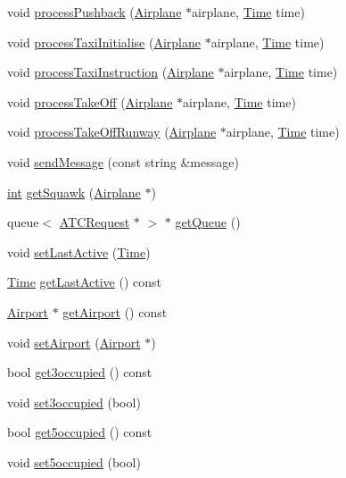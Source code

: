 \begin{DoxyCompactItemize}
\item 
void \hyperlink{classATC_a15754e64db38a7d1280d1ffd5b1db652}{process\+Pushback} (\hyperlink{classAirplane}{Airplane} $\ast$airplane, \hyperlink{classTime}{Time} time)
\item 
void \hyperlink{classATC_a50cbfabf87d9ebc20ca89baea036d602}{process\+Taxi\+Initialise} (\hyperlink{classAirplane}{Airplane} $\ast$airplane, \hyperlink{classTime}{Time} time)
\item 
void \hyperlink{classATC_aa56d55e184aa49375693bccfc016a689}{process\+Taxi\+Instruction} (\hyperlink{classAirplane}{Airplane} $\ast$airplane, \hyperlink{classTime}{Time} time)
\item 
void \hyperlink{classATC_ac5a18f099244ebdc6edcca687d02c1cf}{process\+Take\+Off} (\hyperlink{classAirplane}{Airplane} $\ast$airplane, \hyperlink{classTime}{Time} time)
\item 
void \hyperlink{classATC_a90ec9958b0a3b1d4395959afa14165c0}{process\+Take\+Off\+Runway} (\hyperlink{classAirplane}{Airplane} $\ast$airplane, \hyperlink{classTime}{Time} time)
\item 
void \hyperlink{classATC_aa78b32354d28f3f2eac0143df617283b}{send\+Message} (const string \&message)
\item 
\hyperlink{CMakeCache_8txt_a79a3d8790b2588b09777910863574e09}{int} \hyperlink{classATC_a6c145d824a9d8a796cbc4bab4519c60a}{get\+Squawk} (\hyperlink{classAirplane}{Airplane} $\ast$)
\item 
queue$<$ \hyperlink{structATCRequest}{A\+T\+C\+Request} $\ast$ $>$ $\ast$ \hyperlink{classATC_abdb60fa0db49dd24abe6392f974d1d51}{get\+Queue} ()
\item 
void \hyperlink{classATC_a797e1a713735665a8a87047d7d93f940}{set\+Last\+Active} (\hyperlink{classTime}{Time})
\item 
\hyperlink{classTime}{Time} \hyperlink{classATC_a81dbae8fdf398da130633ac3e6e2b67c}{get\+Last\+Active} () const 
\item 
\hyperlink{classAirport}{Airport} $\ast$ \hyperlink{classATC_a6fb413edf7b32e9caa989eaf14db7eb7}{get\+Airport} () const 
\item 
void \hyperlink{classATC_add8d36b90b6a765fd0c3a03fe3ea6df0}{set\+Airport} (\hyperlink{classAirport}{Airport} $\ast$)
\item 
bool \hyperlink{classATC_a42d6e1db07222e692efc1787d55f6207}{get3occupied} () const 
\item 
void \hyperlink{classATC_a701c3c84fafe9709a6e565674b79e6e6}{set3occupied} (bool)
\item 
bool \hyperlink{classATC_aced18c9a8d72a8998b3ebdc53328d2ed}{get5occupied} () const 
\item 
void \hyperlink{classATC_a90a771ef2994c14d78bbb32c34f24f69}{set5occupied} (bool)
\end{DoxyCompactItemize}

